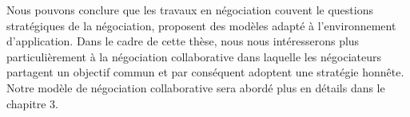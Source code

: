 		  
		Nous pouvons conclure que les travaux en négociation couvent le questions stratégiques de la négociation, proposent des modèles adapté à l'environnement d'application. Dans le cadre de cette thèse, nous nous intéresserons plus particulièrement à la négociation collaborative dans laquelle les négociateurs partagent un objectif commun et par conséquent adoptent une stratégie honnête. Notre modèle de négociation collaborative sera abordé plus en détails dans le chapitre 3. 
		
		

	
	

